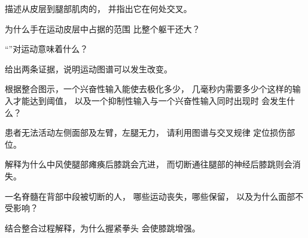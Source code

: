 \begin{exercise}[$\star$]\label{exo:g12:brain-and-movement:2}
描述从皮层到腿部肌肉的，
并指出它在何处交叉。
\end{exercise}

\begin{exercise}[$\star$]\label{exo:g12:brain-and-movement:3}
为什么手在运动皮层中占据的范围
比整个躯干还大？
\end{exercise}

\begin{exercise}[$\star$]\label{exo:g12:brain-and-movement:4}
“”对运动意味着什么？
\end{exercise}

\begin{exercise}[$\star$]\label{exo:g12:brain-and-movement:5}
给出两条证据，说明运动图谱可以发生改变。
\end{exercise}

\begin{exercise}[$\star\star$]\label{exo:g12:brain-and-movement:6}
根据整合图示，一个兴奋性输入能使去极化多少，
几毫秒内需要多少个这样的输入才能达到阈值，
以及一个抑制性输入与一个兴奋性输入同时出现时
会发生什么？
\end{exercise}

\begin{exercise}[$\star\star$]\label{exo:g12:brain-and-movement:7}
患者无法活动左侧面部及左臂，左腿无力，
请利用图谱与交叉规律
定位损伤部位。
\end{exercise}

\begin{exercise}[$\star\star$]\label{exo:g12:brain-and-movement:8}
解释为什么中风使腿部瘫痪后膝跳会亢进，
而切断通往腿部的神经后膝跳则会消失。
\end{exercise}

\begin{exercise}[$\star\star$]\label{exo:g12:brain-and-movement:9}
一名脊髓在背部中段被切断的人，
哪些运动丧失，哪些保留，
以及为什么面部不受影响？
\end{exercise}

\begin{exercise}[$\star\star$]\label{exo:g12:brain-and-movement:10}
结合整合过程解释，为什么握紧拳头
会使膝跳增强。
\end{exercise}

